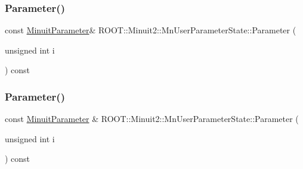 \subsubsection{\texorpdfstring{Parameter()}{Parameter()}\hspace{0.1cm}{\footnotesize\ttfamily [1/3]}}
{\footnotesize\ttfamily const \mbox{\hyperlink{classROOT_1_1Minuit2_1_1MinuitParameter}{Minuit\+Parameter}}\& R\+O\+O\+T\+::\+Minuit2\+::\+Mn\+User\+Parameter\+State\+::\+Parameter (\begin{DoxyParamCaption}\item[{unsigned int}]{i }\end{DoxyParamCaption}) const}

\mbox{\label{classROOT_1_1Minuit2_1_1MnUserParameterState_a8a3fa916f75abaa442d96ab3af55a5af}} 
\subsubsection{\texorpdfstring{Parameter()}{Parameter()}\hspace{0.1cm}{\footnotesize\ttfamily [2/3]}}
{\footnotesize\ttfamily const \mbox{\hyperlink{classROOT_1_1Minuit2_1_1MinuitParameter}{Minuit\+Parameter}} \& R\+O\+O\+T\+::\+Minuit2\+::\+Mn\+User\+Parameter\+State\+::\+Parameter (\begin{DoxyParamCaption}\item[{unsigned int}]{i }\end{DoxyParamCaption}) const}

